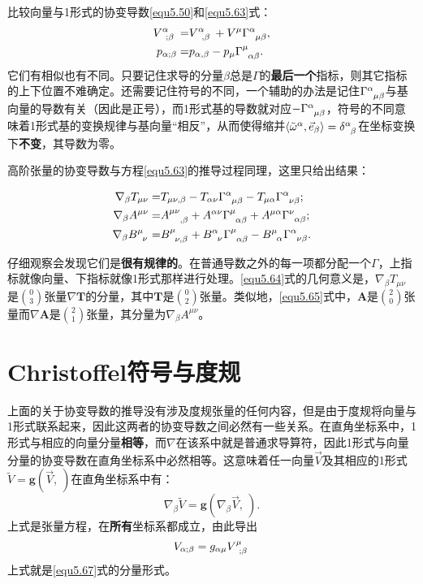 比较向量与1形式的协变导数\eqref{equ5.50}和\eqref{equ5.63}式：
\begin{align*}
    V\indices{^\alpha_{; \beta}} =& V\indices{^\alpha_{, \beta}} + V^\mu \Gamma\indices{^\alpha_{\mu \beta}}, \\
    p_{\alpha; \beta} =& p_{\alpha, \beta} - p_\mu \Gamma\indices{^\mu_{\alpha \beta}}.
\end{align*}
它们有相似也有不同。只要记住求导的分量$\beta$总是$\Gamma$的\textbf{最后一个}指标，则其它指标的上下位置不难确定。还需要记住符号的不同，一个辅助的办法是记住$\Gamma\indices{^\alpha_{\mu \beta}}$与基向量的导数有关（因此是正号），而1形式基的导数就对应$-\Gamma\indices{^\alpha_{\mu \beta}}$，符号的不同意味着1形式基的变换规律与基向量“相反”，从而使得缩并$\langle \tilde{\omega}^\alpha, \vec{e}_\beta \rangle = \delta\indices{^\alpha_\beta}$在坐标变换下\textbf{不变}，其导数为零。

高阶张量的协变导数与方程\eqref{equ5.63}的推导过程同理，这里只给出结果：
\begin{shaded}
\begin{align}
    \nabla_\beta T_{\mu \nu} =& T_{\mu \nu, \beta} - T_{\alpha \nu} \Gamma\indices{^\alpha_{\mu \beta}} - T_{\mu \alpha} \Gamma\indices{^\alpha_{\nu \beta}} ; \label{equ5.64} \\
    \nabla_\beta A^{\mu \nu} =& A\indices{^{\mu \nu}_{, \beta}} + A^{\alpha \nu} \Gamma\indices{^\mu_{\alpha \beta}} + A^{\mu \alpha} \Gamma\indices{^\nu_{\alpha \beta}}; \label{equ5.65} \\
    \nabla_\beta B\indices{^\mu_\nu} =& B\indices{^\mu_{\nu, \beta}} + B\indices{^\alpha_\nu} \Gamma\indices{^\mu_{\alpha \beta}} - B\indices{^\mu_\alpha} \Gamma\indices{^\alpha_{\nu \beta}}. \label{equ5.66}
\end{align}
\end{shaded}
仔细观察会发现它们是\textbf{很有规律的}。在普通导数之外的每一项都分配一个$\Gamma$，上指标就像向量、下指标就像1形式那样进行处理。\eqref{equ5.64}式的几何意义是，$\nabla_\beta T_{\mu \nu}$是$\binom{0}{3}$张量$\nabla \bm{T}$的分量，其中$\bm{T}$是$\binom{0}{2}$张量。类似地，\eqref{equ5.65}式中，$\bm{A}$是$\binom{2}{0}$张量而$\nabla \bm{A}$是$\binom{2}{1}$张量，其分量为$\nabla_\beta A^{\mu \nu}$。

\section{Christoffel符号与度规}
\label{sec5.4}
上面的关于协变导数的推导没有涉及度规张量的任何内容，但是由于度规将向量与1形式联系起来，因此这两者的协变导数之间必然有一些关系。在直角坐标系中，1形式与相应的向量分量\textbf{相等}，而$\nabla$在该系中就是普通求导算符，因此1形式与向量分量的协变导数在直角坐标系中必然相等。这意味着任一向量$\vec{V}$及其相应的1形式$\tilde{V} = \bm{g} (\vec{V}, \ )$在直角坐标系中有：
\begin{equation}
    \nabla_\beta \tilde{V} = \bm{g} (\nabla_\beta \vec{V}, \ ).
\label{equ5.67}
\end{equation}
上式是张量方程，在\textbf{所有}坐标系都成立，由此导出
\begin{equation}
    V_{\alpha; \beta} = g_{\alpha \mu} V\indices{^\mu_{; \beta}}
\label{equ5.68}
\end{equation}
上式就是\eqref{equ5.67}式的分量形式。

